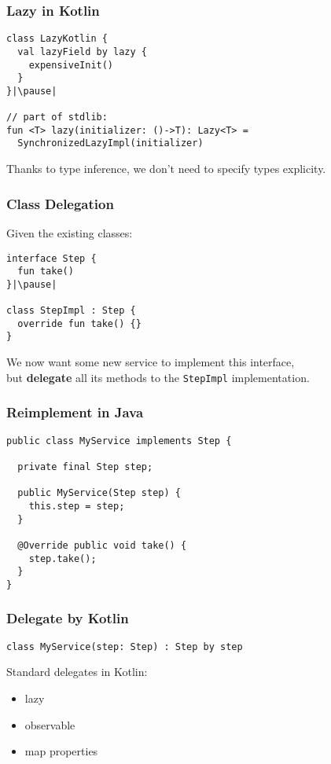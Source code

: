 \begin{frame}[fragile] \frametitle{Lazy in Kotlin}
\begin{lstlisting}
class LazyKotlin {
  val lazyField by lazy {
    expensiveInit()
  }
}|\pause|

// part of stdlib:
fun <T> lazy(initializer: ()->T): Lazy<T> =
  SynchronizedLazyImpl(initializer)
\end{lstlisting}
\pause
Thanks to type inference, we don't need to specify types explicity.
\end{frame}


\begin{frame}[fragile] \frametitle{Class Delegation}
Given the existing classes:
\begin{lstlisting}
interface Step {
  fun take()
}|\pause|

class StepImpl : Step {
  override fun take() {}
}
\end{lstlisting}
\pause
We now want some new service to implement this interface, \\
but \textbf{delegate} all its methods to the \texttt{StepImpl} implementation.
\end{frame}

\begin{frame}[fragile] \frametitle{Reimplement in Java}
\begin{lstlisting}
public class MyService implements Step {

  private final Step step;
  
  public MyService(Step step) {
    this.step = step;
  }
  
  @Override public void take() {
    step.take();
  }
}
\end{lstlisting}
\end{frame}


\begin{frame}[fragile] \frametitle{Delegate by Kotlin}
\begin{lstlisting}
class MyService(step: Step) : Step by step
\end{lstlisting}
\pause
\vspace{0.5cm}
Standard delegates in Kotlin:
\begin{itemize}
	\item lazy
	\item observable
	\item map properties
\end{itemize}
\end{frame}

